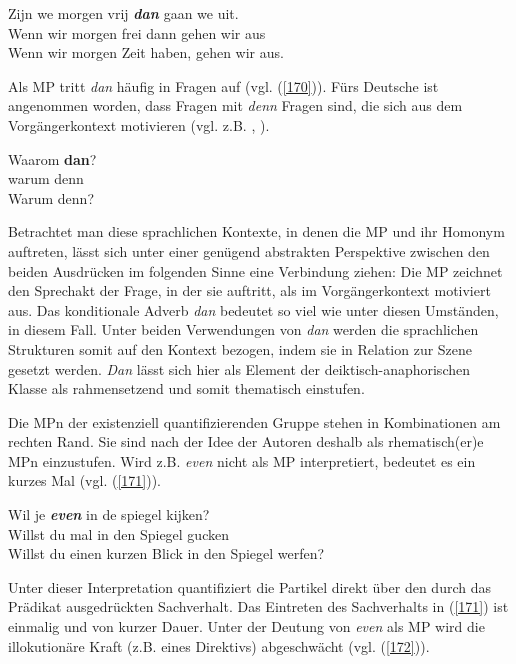 \begin{exe}
	\ex\label{169} 
	\gll Zijn we morgen vrij \textbf{\textit{dan}} gaan we uit.\\
	Wenn wir morgen frei dann gehen wir aus\\
    \glt Wenn wir morgen Zeit haben, gehen wir aus. 
\newline
\hbox{}\hfill\hbox {\citet[50]{Vriendt1991}}
\end{exe}
Als MP tritt \textit{dan} häufig in Fragen auf (vgl. (\ref{170})). Fürs Deutsche ist angenommen worden, dass Fragen mit \textit{denn} Fragen sind, die sich aus dem Vorgängerkontext motivieren (vgl. z.B. \citealt[164, 166]{Thurmair1989}, \citealt[420]{Diewald2006}). 

\begin{exe}
	\ex\label{170} 
	\gll Waarom \textbf{dan}?\\
	 warum   denn \\
    \glt Warum denn?
\hfill\hbox {\citet[50]{Vriendt1991}}
\end{exe}
Betrachtet man diese sprachlichen Kontexte, in denen die MP und ihr Homonym auftreten, lässt sich unter einer genügend abstrakten Perspektive zwischen den beiden Ausdrücken im folgenden Sinne eine Verbindung ziehen: Die MP zeichnet den Sprechakt der Frage, in der sie auftritt, als im Vorgängerkontext motiviert aus. Das konditionale Adverb \textit{dan} bedeutet so viel wie \glq unter diesen Umständen\grq {}, \glq in diesem Fall\grq {}. Unter beiden Verwendungen von \textit{dan} werden die sprachlichen Strukturen somit auf den Kontext bezogen, indem sie in Relation zur \glq Szene\grq {} gesetzt werden. \textit{Dan} lässt sich hier als Element der deiktisch-anaphorischen Klasse  als  \glq rahmensetzend\grq {}  und somit thematisch einstufen.

Die MPn der existenziell quantifizierenden Gruppe  stehen in Kombinationen am rechten Rand. Sie sind nach der Idee der Autoren deshalb als rhematisch(er)e MPn einzustufen. Wird z.B. \textit{even} nicht als MP interpretiert, bedeutet es  \glq ein kurzes Mal\grq {} (vgl. (\ref{171})).

\begin{exe}
	\ex\label{171} 
	\gll Wil je \textbf{\textit{even}} in de spiegel kijken?\\
	 Willst du mal in den Spiegel gucken\\
    \glt Willst du einen kurzen Blick in den Spiegel werfen?
\newline
\hbox{}\hfill\hbox {\citet[53]{Vriendt1991}}
\end{exe}
Unter dieser Interpretation quantifiziert die Partikel direkt über den durch das Prädikat ausgedrückten Sachverhalt. Das Eintreten des Sachverhalts in (\ref{171}) ist einmalig und von kurzer Dauer. Unter der Deutung von \textit{even} als MP wird die illokutionäre Kraft (z.B. eines Direktivs) abgeschwächt (vgl. (\ref{172})). 

